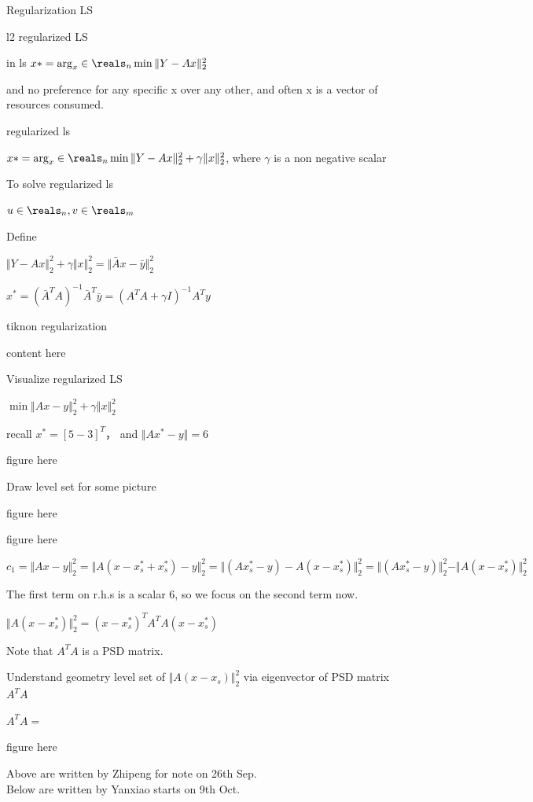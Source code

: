 Regularization LS

l2 regularized LS

in ls $x*=\arg_x\in\reals_{n} \min \Vert Y-Ax\Vert ^2_2$

and no preference for any specific x over any other, and often x is a vector of resources consumed.

regularized ls

$x*=\arg_x\in\reals_{n} \min \Vert Y-Ax\Vert ^2_2 + \gamma \Vert x\Vert ^2_2$, where $\gamma$ is a non negative scalar


To solve regularized ls

$u\in\reals_{n}, v\in\reals_{m}$


Define


$\Vert Y-Ax\Vert ^2_2 + \gamma \Vert x\Vert ^2_2=\Vert \bar{A}x-\bar{y}\Vert^2_2$

$x^*=(\bar{A}^TA)^{-1}\bar{A}^T\bar{y}=(A^TA+\gamma I)^{-1}A^Ty$


tiknon regularization

content here


Visualize regularized LS

$\min \Vert Ax-y\Vert_2^2 +\gamma\Vert x\Vert^2_2$

recall $x^*=[5 -3]^T$， and $\Vert Ax^*-y\Vert = 6$

figure here


Draw level set for some picture

figure here

figure here



$c_1=\Vert Ax-y\Vert^2_2=\Vert A(x-x_s^*+x_s^*)-y\Vert^2_2=\Vert (Ax_s^*-y)-A(x-x_s^*)\Vert^2_2=\Vert (Ax_s^*-y)\Vert^2_2 - \Vert A(x-x_s^*)\Vert^2_2$

The first term on r.h.s is a scalar 6, so we focus on the second term now.

$\Vert A(x-x_s^*)\Vert^2_2= (x-x_s^*)^T A^TA (x-x_s^*)$ 

Note that $A^TA$ is a PSD matrix.


Understand geometry level set of $\Vert A(x-x_s)\Vert^2_2$ via eigenvector of PSD matrix $A^TA$


$A^TA=$

figure here

















Above are written by Zhipeng for note on 26th Sep. \\

Below are written by Yanxiao starts on 9th Oct. \\

